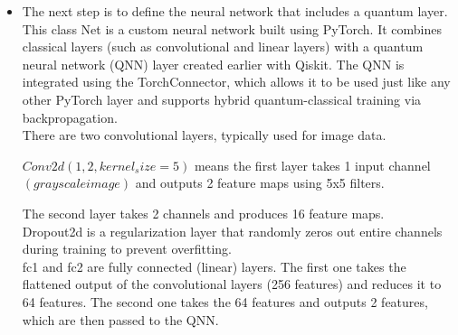 \documentclass[conference]{IEEEtran}
\begin{document}
\begin{itemize}
\begin{itemize}
        \end{itemize}

        The choice of ansatz is crucial as it determines the expressiveness and complexity of the quantum model. In this case i used the .


{\small
\begin{verbatim}
def create_qnn():
    feature_map = ZZFeatureMap(2)
    ansatz = RealAmplitudes(
        2, reps=1)
    qc = QuantumCircuit(2)
    qc.compose(
        feature_map, inplace=True)
    qc.compose(
        ansatz, inplace=True)

    qnn = EstimatorQNN(
        circuit=qc,
        input_params=
        feature_map.parameters,
        weight_params=
        ansatz.parameters,
        input_gradients=True,
        estimator=estimator,
    )
    return qnn

qnn4 = create_qnn()
\end{verbatim}
}

        \item The next step is to define the neural network that includes a quantum layer.\\

        This class Net \cite{pytorch_net} is a custom neural network built using PyTorch. It combines classical layers (such as convolutional and linear layers) with a quantum neural network (QNN) layer created earlier with Qiskit. The QNN is integrated using the TorchConnector, which allows it to be used just like any other PyTorch layer and supports hybrid quantum-classical training via backpropagation.\\

        There are two convolutional layers, typically used for image data.

        $Conv2d(1, 2, kernel_size=5)$ means the first layer takes 1 input channel $(grayscale image)$ and outputs 2 feature maps using 5x5 filters.

        The second layer takes 2 channels and produces 16 feature maps.\\

        Dropout2d \cite{pytorch_dropout2d} is a regularization layer that randomly zeros out entire channels during training to prevent overfitting.\\

        fc1 and fc2 are fully connected (linear) layers. The first one takes the flattened output of the convolutional layers (256 features) and reduces it to 64 features. The second one takes the 64 features and outputs 2 features, which are then passed to the QNN.\\


\end{itemize}
\end{document}
